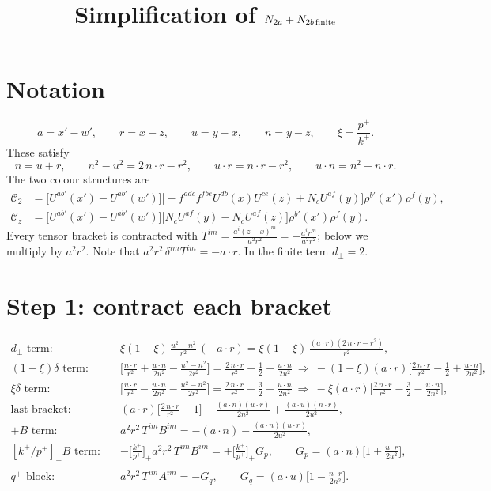 \documentclass[10pt]{article}
\title{Simplification of $N_{2a}+N_{2b\,\rm finite}$}
\date{}
\begin{document}
\maketitle

\section*{Notation}
\begin{equation}
a=x'-w',\qquad r=x-z,\qquad u=y-x,\qquad n=y-z,\qquad \xi=\frac{p^{+}}{k^{+}} .
\end{equation}
These satisfy
\begin{equation}
n=u+r,\qquad n^{2}-u^{2}=2\,n\cdot r-r^{2},\qquad u\cdot r=n\cdot r-r^{2},\qquad u\cdot n=n^{2}-n\cdot r .
\end{equation}
The two colour structures are
\begin{align}
\mathcal{C}_{2}&=\Big[U^{ab'}(x')-U^{ab'}(w')\Big]\Big[-f^{adc}f^{fbe}U^{db}(x)U^{ce}(z)+N_{c}U^{af}(y)\Big]\rho^{b'}(x')\rho^{f}(y),\\
\mathcal{C}_{z}&=\Big[U^{ab'}(x')-U^{ab'}(w')\Big]\Big[N_{c}U^{af}(y)-N_{c}U^{af}(z)\Big]\rho^{b'}(x')\rho^{f}(y).
\end{align}
Every tensor bracket is contracted with $T^{im}=\frac{a^{i}(z-x)^{m}}{a^{2}r^{2}}=-\frac{a^{i}r^{m}}{a^{2}r^{2}}$; below we multiply by $a^{2}r^{2}$. Note that $a^{2}r^{2}\,\delta^{im}T^{im}=-a\cdot r$. In the finite term $d_{\perp}=2$.

\section*{Step 1: contract each bracket}
\begin{align}
\text{$d_{\perp}$ term:}\quad&\xi(1-\xi)\,\frac{u^{2}-n^{2}}{r^{2}}\,(-a\cdot r)=\xi(1-\xi)\,\frac{(a\cdot r)(2\,n\cdot r-r^{2})}{r^{2}},\\
\text{$(1-\xi)\delta$ term:}\quad&\Big[\frac{n\cdot r}{r^{2}}+\frac{u\cdot n}{2u^{2}}-\frac{u^{2}-n^{2}}{2r^{2}}\Big]=\frac{2\,n\cdot r}{r^{2}}-\frac12+\frac{u\cdot n}{2u^{2}}
\ \Rightarrow\ -(1-\xi)(a\cdot r)\Big[\frac{2\,n\cdot r}{r^{2}}-\frac12+\frac{u\cdot n}{2u^{2}}\Big],\\
\text{$\xi\delta$ term:}\quad&\Big[\frac{u\cdot r}{r^{2}}-\frac{u\cdot n}{2n^{2}}-\frac{u^{2}-n^{2}}{2r^{2}}\Big]=\frac{2\,n\cdot r}{r^{2}}-\frac32-\frac{u\cdot n}{2n^{2}}
\ \Rightarrow\ -\xi(a\cdot r)\Big[\frac{2\,n\cdot r}{r^{2}}-\frac32-\frac{u\cdot n}{2n^{2}}\Big],\\
\text{last bracket:}\quad&(a\cdot r)\Big[\frac{2\,n\cdot r}{r^{2}}-1\Big]-\frac{(a\cdot n)(u\cdot r)}{2n^{2}}+\frac{(a\cdot u)(n\cdot r)}{2u^{2}},\\
\text{$+B$ term:}\quad&a^{2}r^{2}\,T^{im}B^{im}=-(a\cdot n)-\frac{(a\cdot n)(u\cdot r)}{2u^{2}},\\
\text{$[k^{+}/p^{+}]_{+}B$ term:}\quad&-\Big[\frac{k^{+}}{p^{+}}\Big]_{+}a^{2}r^{2}\,T^{im}B^{im}=+\Big[\frac{k^{+}}{p^{+}}\Big]_{+}G_{p},\qquad G_{p}=(a\cdot n)\Big[1+\frac{u\cdot r}{2u^{2}}\Big],\\
\text{$q^{+}$ block:}\quad&a^{2}r^{2}\,T^{im}A^{im}=-G_{q},\qquad G_{q}=(a\cdot u)\Big[1-\frac{n\cdot r}{2n^{2}}\Big].
\end{align}
\end{document}

